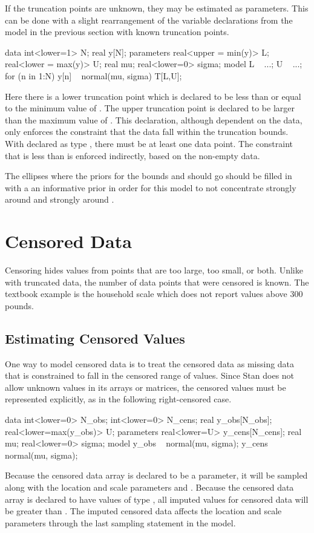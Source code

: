 If the truncation points are unknown, they may be estimated as
parameters.  This can be done with a slight rearrangement of the
variable declarations from the model in the previous section with
known truncation points.
%
\begin{stancode}
data {
  int<lower=1> N;
  real y[N];
}
parameters {
  real<upper = min(y)> L; 
  real<lower = max(y)> U;
  real mu;
  real<lower=0> sigma;
}
model {
  L ~ ...;  
  U ~ ...;
  for (n in 1:N)
    y[n] ~ normal(mu, sigma) T[L,U];
}
\end{stancode}
%
Here there is a lower truncation point  which is declared to
be less than or equal to the minimum value of .  The upper
truncation point  is declared to be larger than the maximum
value of .  This declaration, although dependent on the data,
only enforces the constraint that the data fall within the truncation
bounds.  With  declared as type , there must be
at least one data point.  The constraint that  is less than
 is enforced indirectly, based on the non-empty data.

The ellipses where the priors for the bounds  and 
should go should be filled in with a an informative prior in
order for this model to not concentrate  strongly around 
 and  strongly around .


\section{Censored Data}

Censoring hides values from points that are too large, too small, or
both.  Unlike with truncated data, the number of data points that were
censored is known.  The textbook example is the household scale which
does not report values above 300 pounds.  

\subsection{Estimating Censored Values}

One way to model censored data is to treat the censored data as
missing data that is constrained to fall in the censored range of
values.  Since Stan does not allow unknown values in its arrays or
matrices, the censored values must be represented explicitly, as in the
following right-censored case.
%
\begin{stancode}
data {
  int<lower=0> N_obs;
  int<lower=0> N_cens;
  real y_obs[N_obs];
  real<lower=max(y_obs)> U;
}
parameters {
  real<lower=U> y_cens[N_cens];
  real mu;
  real<lower=0> sigma;
}
model {
  y_obs ~ normal(mu, sigma);
  y_cens ~ normal(mu, sigma);
}
\end{stancode}
%
Because the censored data array  is declared to be a parameter, it
will be sampled along with the location and scale parameters 
and .  Because the censored data array  is
declared to have values of type , all imputed values
for censored data will be greater than .  The imputed censored
data affects the location and scale parameters through the last
sampling statement in the model.  

